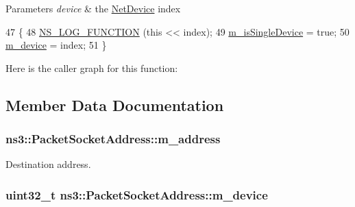 \begin{DoxyParams}{Parameters}
{\em device} & the \hyperlink{classns3_1_1NetDevice}{Net\+Device} index \\
\hline
\end{DoxyParams}

\begin{DoxyCode}
47 \{
48   \hyperlink{log-macros-disabled_8h_a90b90d5bad1f39cb1b64923ea94c0761}{NS\_LOG\_FUNCTION} (\textcolor{keyword}{this} << index);
49   \hyperlink{classns3_1_1PacketSocketAddress_a96c62833941b0d645a43dfe4f4668a3a}{m\_isSingleDevice} = \textcolor{keyword}{true};
50   \hyperlink{classns3_1_1PacketSocketAddress_a79577415c47dc03939872d20dc3a1c35}{m\_device} = index;
51 \}
\end{DoxyCode}


Here is the caller graph for this function\+:




\subsection{Member Data Documentation}
\subsubsection[{\texorpdfstring{m\+\_\+address}{m_address}}]{ ns3\+::\+Packet\+Socket\+Address\+::m\+\_\+address\hspace{0.3cm}{\ttfamily [private]}}\hypertarget{classns3_1_1PacketSocketAddress_a5df3880f8024ed73a1fac83ab454d7b4}{}\label{classns3_1_1PacketSocketAddress_a5df3880f8024ed73a1fac83ab454d7b4}


Destination address. 

\subsubsection[{\texorpdfstring{m\+\_\+device}{m_device}}]{\setlength{\rightskip}{0pt plus 5cm}uint32\+\_\+t ns3\+::\+Packet\+Socket\+Address\+::m\+\_\+device\hspace{0.3cm}{\ttfamily [private]}}\hypertarget{classns3_1_1PacketSocketAddress_a79577415c47dc03939872d20dc3a1c35}{}\label{classns3_1_1PacketSocketAddress_a79577415c47dc03939872d20dc3a1c35}


